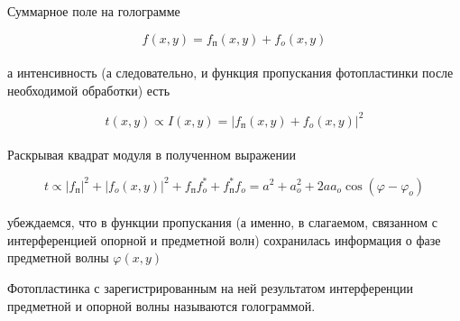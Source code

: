 Суммарное поле на голограмме

$$
f(x,y) = f_{\text{п}}(x, y) + f_o(x,y)
$$
\\
а интенсивность (а следовательно, и функция пропускания фотопластинки после необходимой обработки) 
есть

$$
t(x,y) \propto I(x, y) = |f_{\text{п}}(x, y) + f_o(x,y)|^2
$$
\\
Раскрывая квадрат модуля в полученном выражении

$$
t \propto |f_{\text{п}}|^2 + |f_o(x,y)|^2 + f_{\text{п}} f_o^* + f_{\text{п}}^* f_o =
          a^2 + a_o^2 + 2 a a_o \cos (\varphi - \varphi_o)
$$
\\
убеждаемся, что в функции пропускания (а именно, в слагаемом, связанном с интерференцией опорной
и предметной волн) сохранилась информация о фазе предметной волны $\varphi(x, y)$

Фотопластинка с зарегистрированным на ней результатом интерференции предметной и опорной волны 
называются голограммой.